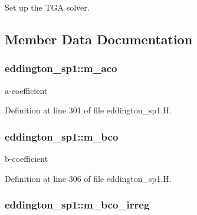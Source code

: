 Set up the T\+GA solver. 



\subsection{Member Data Documentation}
\subsubsection[{\texorpdfstring{m\+\_\+aco}{m_aco}}]{ eddington\+\_\+sp1\+::m\+\_\+aco\hspace{0.3cm}{\ttfamily [protected]}}\hypertarget{classeddington__sp1_ae6993f6535e80266677384cd1d290927}{}\label{classeddington__sp1_ae6993f6535e80266677384cd1d290927}


a-\/coefficient 



Definition at line 301 of file eddington\+\_\+sp1.\+H.

\subsubsection[{\texorpdfstring{m\+\_\+bco}{m_bco}}]{ eddington\+\_\+sp1\+::m\+\_\+bco\hspace{0.3cm}{\ttfamily [protected]}}\hypertarget{classeddington__sp1_a53bdb3ad07165ca354cbb7078cdb30a5}{}\label{classeddington__sp1_a53bdb3ad07165ca354cbb7078cdb30a5}


b-\/coefficient 



Definition at line 306 of file eddington\+\_\+sp1.\+H.

\subsubsection[{\texorpdfstring{m\+\_\+bco\+\_\+irreg}{m_bco_irreg}}]{ eddington\+\_\+sp1\+::m\+\_\+bco\+\_\+irreg\hspace{0.3cm}{\ttfamily [protected]}}\hypertarget{classeddington__sp1_a992bfd5da0891c001cf63619230d96d1}{}\label{classeddington__sp1_a992bfd5da0891c001cf63619230d96d1}


